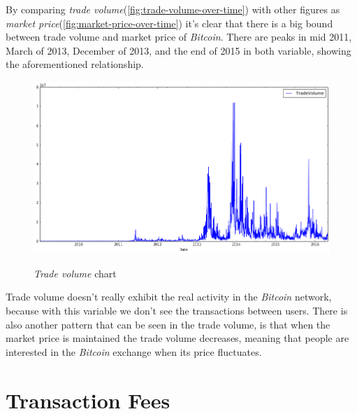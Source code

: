 By comparing \textit{trade
volume}(\autoref{fig:trade-volume-over-time}) with other figures as
\textit{market price}(\autoref{fig:market-price-over-time}) it's clear
that there is a big bound between trade volume and market price of
\textit{Bitcoin}. There are peaks in mid 2011, March of 2013, December
of 2013, and the end of 2015 in both variable, showing the
aforementioned relationship.

\begin{figure}[bth]
  \myfloatalign
  {\includegraphics[width=1\linewidth]
    {gfx/trade-volume-over-time}}
  \caption{\textit{Trade volume}
    chart}
  \label{fig:trade-volume-over-time}
\end{figure}

Trade volume doesn't really exhibit the real activity in the
\textit{Bitcoin} network, because with this variable we don't see the
transactions between users. There is also another pattern that can be
seen in the trade volume, is that when the market price is maintained
the trade volume decreases, meaning that people are interested in the
\textit{Bitcoin} exchange when its price fluctuates.


\section{Transaction Fees}
\label{sec:transaction-fees}

